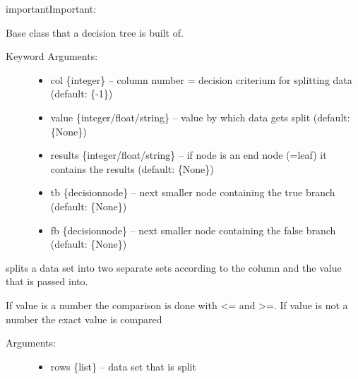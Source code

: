 \documentclass[letterpaper,10pt,english]{sphinxmanual}
\begin{document}
\begin{sphinxadmonition}{important}{Important:}
\label{\detokenize{DT:decisionnode}}

\begin{fulllineitems}
\label{\detokenize{DT:ForestFire.Main.decisionnode}}
Base class that a decision tree is built of.
\begin{description}
\item[{Keyword Arguments:}] \leavevmode\begin{itemize}
\item {} 
col \{integer\} -- column number = decision criterium for splitting data (default: \{-1\})

\item {} 
value \{integer/float/string\} -- value by which data gets split (default: \{None\})

\item {} 
results \{integer/float/string\} -- if node is an end node (=leaf) it contains the results (default: \{None\})

\item {} 
tb \{decisionnode\} -- next smaller node containing the true branch (default: \{None\})

\item {} 
fb \{decisionnode\} -- next smaller node containing the false branch (default: \{None\})

\end{itemize}

\end{description}

\end{fulllineitems}

\label{\detokenize{DT:divideset}}

\begin{fulllineitems}
\label{\detokenize{DT:ForestFire.Main.divideset}}
splits a data set into two separate sets according to the column and the value that is passed into.

If value is a number the comparison is done with \textless{}= and \textgreater{}=.
If value is not a number the exact value is compared
\begin{description}
\item[{Arguments:}] \leavevmode\begin{itemize}
\item {} 
rows \{list\} -- data set that is split


\end{itemize}
\end{description}
\end{fulllineitems}
\end{sphinxadmonition}
\end{document}
